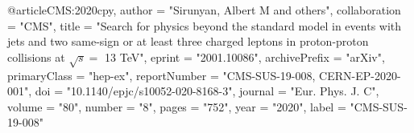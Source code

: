 @article{CMS:2020cpy,
    author = "Sirunyan, Albert M and others",
    collaboration = "CMS",
    title = "{Search for physics beyond the standard model in events with jets and two same-sign or at least three charged leptons in proton-proton collisions at $\sqrt{s}=$ 13 TeV}",
    eprint = "2001.10086",
    archivePrefix = "arXiv",
    primaryClass = "hep-ex",
    reportNumber = "CMS-SUS-19-008, CERN-EP-2020-001",
    doi = "10.1140/epjc/s10052-020-8168-3",
    journal = "Eur. Phys. J. C",
    volume = "80",
    number = "8",
    pages = "752",
    year = "2020",
    label = "CMS-SUS-19-008"
}

